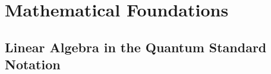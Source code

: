 \documentclass[
	11pt, %
	a4paper, %
]{LegrandOrangeBook}
\begin{document}


\pagestyle{empty} %

\tableofcontents %



\pagestyle{fancy} %

\cleardoublepage %


\chapterspaceabove{6.75cm} %
\chapterspacebelow{7.25cm} %




\part{Mathematical Foundations}

\chapter{Linear Algebra in the Quantum Standard Notation}
\end{document}
